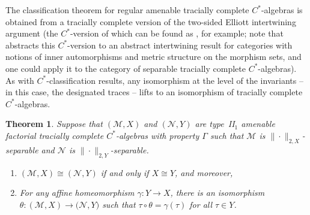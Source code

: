 \documentclass[a4paper,11pt]{amsart}
\newtheorem{theorem}{Theorem}
\theoremstyle{definition}
\numberwithin{equation}{section}
\numberwithin{theorem}{section}
\begin{document}
		
The classification theorem for regular amenable tracially complete $C^*$-algebras  is obtained from a tracially complete version of the two-sided Elliott intertwining argument (the $C^*$-version of which can be found as  \cite[Corollary~2.3.4]{Rordam-Book}, for example; note that \cite[Theorem~3]{El09} abstracts this $C^*$-version to an abstract intertwining result for categories with notions of inner automorphisms and metric structure on the morphism sets, and one could apply it to the category of separable tracially complete $C^*$-algebras).  As with $C^*$-classification results, any isomorphism at the level of the invariants -- in this case, the designated traces -- lifts to an isomorphism of tracially complete $C^*$-algebras.

\begin{theorem}
	\label{thm:classification}
	Suppose that $(\mathcal M, X)$ and $(\mathcal N, Y)$ are type~{\rm II}$_1$ {}amenable factorial tracially complete $C^*$-algebras with property $\Gamma$ such that $\mathcal M$ is \mbox{$\|\cdot\|_{2, X}$}-separable and $\mathcal N$ is $\|\cdot\|_{2, Y}$-separable. 
	\begin{enumerate}
		\item\label{alg-classif1} $(\mathcal M, X) \cong (\mathcal N, Y)$ if and only if $X \cong Y$, and moreover,
		\item\label{alg-classif2} For any affine homeomorphism $\gamma \colon Y \rightarrow X$, there is an isomorphism $\theta \colon (\mathcal M, X) \rightarrow \mathcal (\mathcal N, Y)$ such that $\tau \circ \theta = \gamma(\tau)$ for all $\tau \in Y$.
	\end{enumerate}
\end{theorem}
\end{document}
